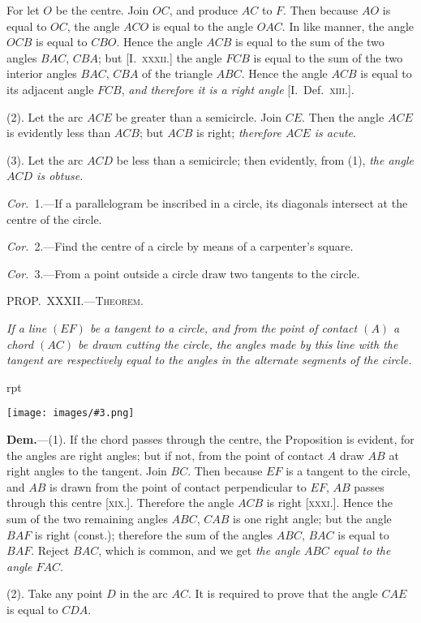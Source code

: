 \documentclass[oneside]{book}
\newcounter{wrapwidth}
\newcommand\mypropl[2]{
\bigskip\Needspace*{4\baselineskip}\begin{center}\textsc{#1}\end{center}
\hspace{\parindent}\emph{#2}\par\medskip
}
\newcommand\imgflow[3]{
\setcounter{wrapwidth}{#1}
\begin{wrapfigure}[#2]{r}{\value{wrapwidth}pt}
\begin{center}
\vspace{-0.3in}
\texttt{[image: images/\#3.png]}
\end{center}
\end{wrapfigure}
}
\begin{document}
For let $O$ be the centre.
Join $OC$, and produce $AC$ to
$F$. Then because $AO$ is equal
to $OC$, the angle $ACO$ is equal
to the angle $OAC$. In like
manner, the angle $OCB$ is
equal to $CBO$. Hence the
angle $ACB$ is equal to the
sum of the two angles $BAC$,
$CBA$; but [I.\ \textsc{xxxii.}] the
angle $FCB$ is equal to the sum of the two interior
angles $BAC$, $CBA$ of the triangle $ABC$. Hence the
angle $ACB$ is equal to its adjacent angle $FCB$, \textit{and
therefore it is a right angle} [I.\ Def.\ \textsc{xiii.}].

(2). Let the arc $ACE$ be greater than a semicircle.
Join $CE$. Then the angle $ACE$ is evidently less than
$ACB$; but $ACB$ is right; \textit{therefore $ACE$ is acute}.


(3). Let the arc $ACD$ be less than a semicircle; then
evidently, from (1), \emph{the angle $ACD$ is obtuse.}

\emph{Cor.}~1.---If a parallelogram be inscribed in a circle,
its diagonals intersect at the centre of the circle.

\emph{Cor.}~2.---Find the centre of a circle by means of a
carpenter's square.

\emph{Cor.}~3.---From a point outside a circle draw two
tangents to the circle.

\mypropl{PROP\@.~XXXII\@.---Theorem.}{If a line $(EF)$ be a tangent to a circle, and from the
point of contact $(A)$ a chord $(AC)$ be drawn cutting the
circle, the angles made by this line with the tangent are
respectively equal to the angles in the alternate segments
of the circle.}

\imgflow{143}{11}{f138}

\textbf{Dem.}---(1). If the chord passes through the centre,
the Proposition is evident,
for the angles are right
angles; but if not, from the
point of contact $A$ draw $AB$
at right angles to the tangent.
Join $BC$. Then because $EF$
is a tangent to the circle,
and $AB$ is drawn from the
point of contact perpendicular
to $EF$, $AB$ passes through
this centre [\textsc{xix.}]. Therefore
the angle $ACB$ is right [\textsc{xxxi.}]. Hence the sum of the
two remaining angles $ABC$, $CAB$ is one right angle;
but the angle $BAF$ is right (const.); therefore the sum
of the angles $ABC$, $BAC$ is equal to $BAF$. Reject
$BAC$, which is common, and we get \emph{the angle $ABC$
equal to the angle $FAC$}.

(2). Take any point $D$ in the arc $AC$. It is required
to prove that the angle $CAE$ is equal to $CDA$.
\end{document}
